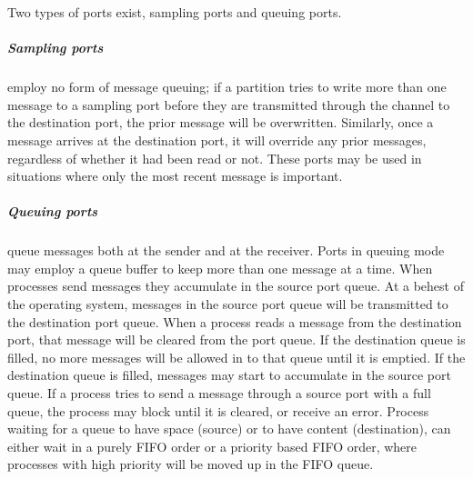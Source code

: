 Two types of ports exist, sampling ports and queuing ports. 
\subparagraph{Sampling ports} employ no form of message queuing; if a partition tries to write more than one message to a sampling port
before they are transmitted through the channel to the destination port, the prior message will be overwritten. Similarly, once a message arrives at the destination port,
it will override any prior messages, regardless of whether it had been read or not. These ports may be used in situations where only the most recent message is important.
\subparagraph{Queuing ports} queue messages both at the sender and at the receiver. Ports in queuing mode may employ a queue buffer to keep more than one message at a time.
When processes send messages they accumulate in the source port queue. At a behest of the operating system, messages in the source port queue will be transmitted to the destination port queue.
When a process reads a message from the destination port, that message will be cleared from the port queue. If the destination queue is filled, no more messages will be allowed
in to that queue until it is emptied. If the destination queue is filled, messages may start to accumulate in the source port queue. If a process tries to send a message through a
source port with a full queue, the process may block until it is cleared, or receive an error.
Process waiting for a queue to have space (source) or to have content (destination), can either wait in a purely FIFO order or a priority based FIFO order, where processes with high priority
will be moved up in the FIFO queue.\\

